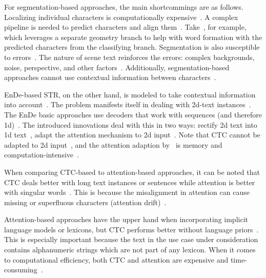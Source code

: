 For segmentation-based approaches, the main shortcommings are as follows.
Localizing individual characters is computationally expensive~\citep{zhan_esir_2019}.
A complex pipeline is needed to predict characters and align them~\citep{liu_abcnet_2020}.
Take~\cite{wan_textscanner_2020}, for example, which leverages a separate geometry branch
to help with word formation with the predicted characters from the classifying branch.
Segmentation is also susceptible to errors~\citep{zhan_esir_2019,cheng_aon_2018,chen_text_2021}.
The nature of scene text reinforces the errors: complex backgrounds, noise, perspective,
and other factors~\citep{hu_gtc_2020,chen_text_2021,baek_what_2019}.
Additionally, segmentation-based approaches cannot use contextual information between
characters~\citep{chen_text_2021}.

\ac{EnDe}-based \ac{STR}, on the other hand, is modeled to take contextual information into
account~\citep{long_scene_2021,chen_text_2021}.
The problem manifests itself in dealing with 2d-text
instances~\citep{long_scene_2021,liao_scene_2018}.
The \ac{EnDe} basic approaches use decoders that work with sequences (and therefore
1d)~\citep{long_scene_2021,cheng_aon_2018}.
The introduced innovations deal with this in two ways: rectify 2d text into 1d
text~\citep{zhan_esir_2019,luo_multi-object_2019,shi_aster_2019,liu_char-net_2018}, adapt the
attention mechanism to 2d input~\citep{li_show_2019}.
Note that \ac{CTC} cannot be adapted to 2d input~\citep{cheng_focusing_2017,xie_aggregation_2019},
and the attention adaption by~\cite{li_show_2019} is memory and
computation-intensive~\citep{xie_aggregation_2019}.

When comparing \ac{CTC}-based to attention-based approaches, it can be noted that \ac{CTC} deals
better with long text instances or sentences while attention is better with singular
words~\citep{cong_comparative_2019,chen_text_2021}.
This is because the misalignment in attention can cause missing or superfluous characters (attention
drift)~\citep{bai_edit_2018,liao_scene_2018,cheng_focusing_2017}.

Attention-based approaches have the upper hand when incorporating implicit language models
or lexicons, but \ac{CTC} performs better without language priors~\citep{cong_comparative_2019}.
This is especially important because the text in the use case under consideration contains
alphanumeric strings which are not part of any lexicon.
When it comes to computational efficiency, both \ac{CTC} and attention are expensive and
time-consuming~\citep{chen_text_2021}.


